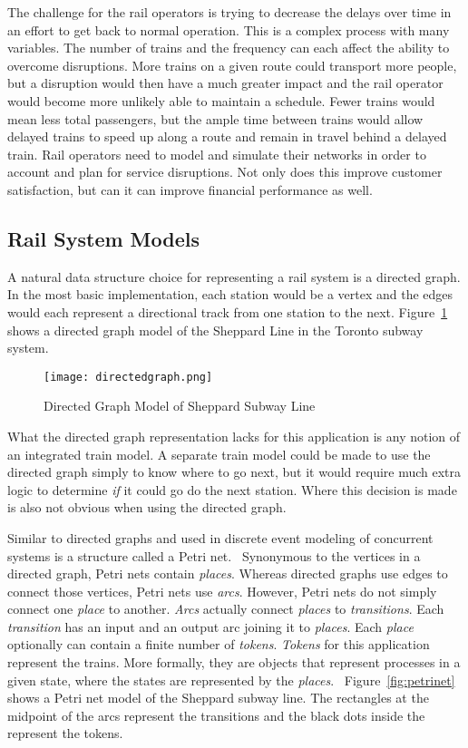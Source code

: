 The challenge for the rail operators is trying to decrease the delays over time
in an effort to get back to normal operation.  This is a complex process with
many variables.  The number of trains and the frequency can each affect the
ability to overcome disruptions.  More trains on a given route could transport
more people, but a disruption would then have a much greater impact and the rail
operator would become more unlikely able to maintain a schedule.  Fewer trains
would mean less total passengers, but the ample time between trains would allow
delayed trains to speed up along a route and remain in travel behind a delayed
train. Rail operators need to model and simulate their networks in order to
account and plan for service disruptions.  Not only does this improve customer
satisfaction, but can it can improve financial performance as well.

\subsection{Rail System Models}

A natural data structure choice for representing a rail system is a directed
graph.  In the most basic implementation, each station would be a vertex and the
edges would each represent a directional track from one station to the next.
Figure~\ref{fig:directedgraph} shows a directed graph model of the Sheppard Line
in the Toronto subway system.

\begin{figure}[htb]
	\centering
	\texttt{[image: directedgraph.png]}
	\caption{Directed Graph Model of Sheppard Subway Line}
	\label{fig:directedgraph}
\end{figure}

What the directed graph representation lacks for this application is any notion
of an integrated train model. A separate train model could be made to use the
directed graph simply to know where to go next, but it would require much extra
logic to determine \textit{if} it could go do the next station.  Where this
decision is made is also not obvious when using the directed graph.

Similar to directed graphs and used in discrete event modeling of concurrent
systems is a structure called a Petri net.~\cite{Petri62}  Synonymous to the
vertices in a directed graph, Petri nets contain \textit{places}.  Whereas
directed graphs use edges to connect those vertices, Petri nets use
\textit{arcs}. However, Petri nets do not simply connect one \textit{place} to
another.  \textit{Arcs} actually connect \textit{places} to
\textit{transitions}. Each \textit{transition} has an input and an output arc
joining it to \textit{places}.  Each \textit{place} optionally can contain a
finite number of \textit{tokens}.  \textit{Tokens} for this application
represent the trains.  More formally, they are objects that represent processes
in a given state, where the states are represented by the
\textit{places}.~\cite{Kristoffersen2003}  Figure~\ref{fig:petrinet} shows a
Petri net model of the Sheppard subway line. The rectangles at the midpoint of
the arcs represent the transitions and the black dots inside the represent the
tokens.

